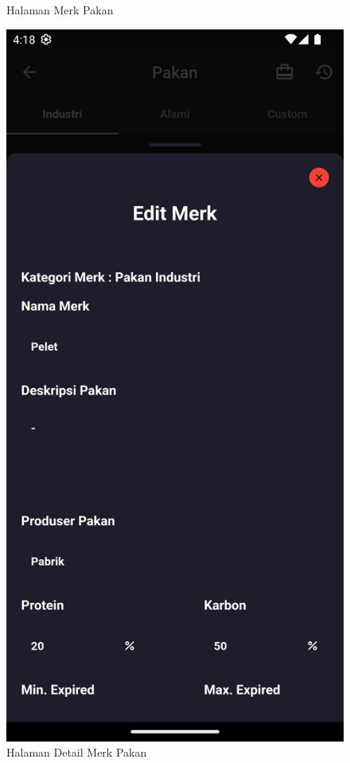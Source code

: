 \begin{spacing}{1.5}
\begin{enumerate}
\begin{itemize}
\begin{figure}[H]
					\caption{Halaman Merk Pakan}
				\endminipage\hfill
					\includegraphics[width=\linewidth]{gambar/sprint4/detail_merk_pakan.png}
					\caption{Halaman Detail Merk Pakan}
				\endminipage\hfill
			\end{figure}
		\end{itemize}


\end{enumerate}
\end{spacing}
